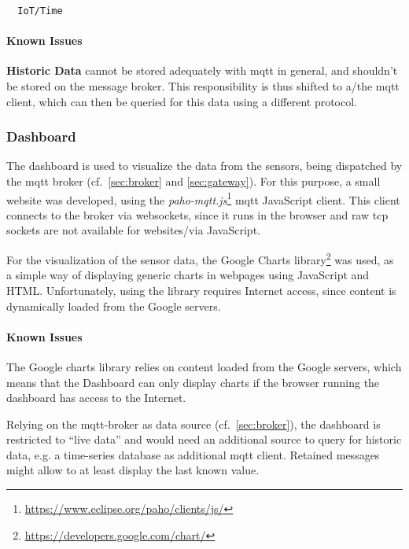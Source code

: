 \begin{lstlisting}
  IoT/Time
\end{lstlisting}

\paragraph{Known Issues}
\begin{compactitem}
  \item \textbf{Historic Data} cannot be stored adequately with \gls{mqtt} in general, and shouldn't be stored on the message broker. This responsibility is thus shifted to a/the \gls{mqtt} client, which can then be queried for this data using a different protocol.
\end{compactitem}


\subsubsection{Dashboard}
\label{sec:dashboard}

The dashboard is used to visualize the data from the sensors, being dispatched by the \gls{mqtt} broker (cf.~\cref{sec:broker} and \cref{sec:gateway}). For this purpose, a small website was developed, using the \textit{paho-mqtt.js}\footnote{\url{https://www.eclipse.org/paho/clients/js/}} \gls{mqtt} JavaScript client. This client connects to the broker via websockets, since it runs in the browser and raw tcp sockets are not available for websites/via JavaScript.

For the visualization of the sensor data, the Google Charts library\footnote{\url{https://developers.google.com/chart/}} was used, as a simple way of displaying generic charts in webpages using JavaScript and HTML. Unfortunately, using the library requires Internet access, since content is dynamically loaded from the Google servers.

\paragraph{Known Issues}
\begin{compactitem}
  \item The Google charts library relies on content loaded from the Google servers, which means that the Dashboard can only display charts if the browser running the dashboard has access to the Internet.
  \item Relying on the \gls{mqtt}-broker as data source (cf.~\cref{sec:broker}), the dashboard is restricted to ``live data'' and would need an additional source to query for historic data, e.g. a time-series database as additional \gls{mqtt} client. Retained messages might allow to at least display the last known value.
\end{compactitem}


